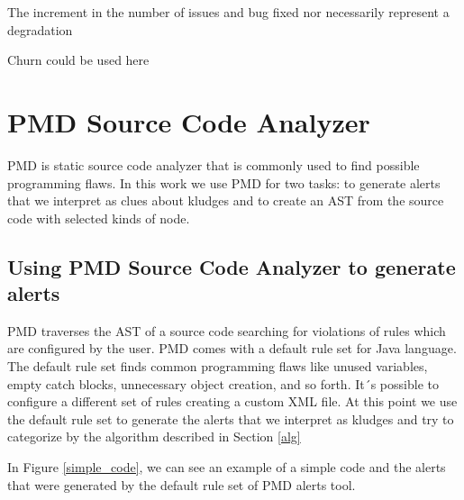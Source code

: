 \documentclass[
]{article}
\begin{document}
The increment in the number of issues and bug fixed nor necessarily
represent a degradation

Churn could be used here

\section{PMD Source Code Analyzer}\label{pmd}

PMD is static source code analyzer that is commonly used to find
possible programming flaws. In this work we use PMD for two tasks: to
generate alerts that we interpret as clues about kludges and to create
an AST from the source code with selected kinds of node.

\subsection{Using PMD Source Code Analyzer to generate alerts}\label{pmd_alerts}

PMD traverses the AST of a source code searching for violations of rules
which are configured by the user. PMD comes with a default rule set for
Java language. The default rule set finds common programming flaws like
unused variables, empty catch blocks, unnecessary object creation, and
so forth. It´s possible to configure a different set of rules creating a
custom XML file. At this point we use the default rule set to generate
the alerts that we interpret as kludges and try to categorize by the
algorithm described in Section \ref{alg}

\newpage

In Figure \ref{simple_code}, we can see an example of a simple code and
the alerts that were generated by the default rule set of PMD alerts
tool.

\small

\normalsize

\small
\end{document}
